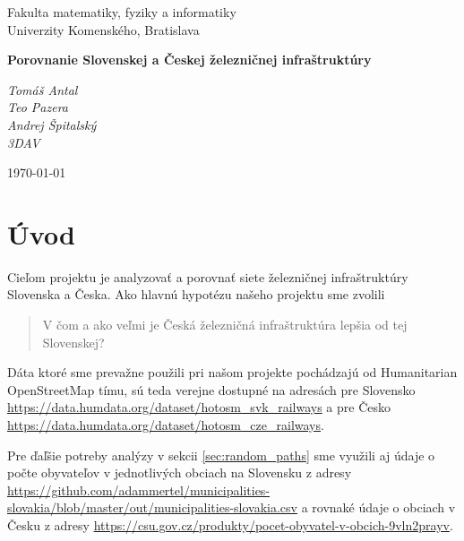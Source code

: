 \documentclass[12pt,a4paper]{article}
\begin{document}
\begin{titlepage}
  \centering

  {\large
    Fakulta matematiky, fyziky a informatiky\\
    Univerzity Komenského, Bratislava
  }\par

  \vspace{4cm}

  {\bfseries\LARGE
    Porovnanie Slovenskej a Českej železničnej infraštruktúry
  }\par

  \vspace{0.5cm}

  \vfill

  \begin{flushleft}
    {\itshape
      Tomáš Antal\\
      Teo Pazera\\
      Andrej Špitalský \\
      3DAV
    }
  \end{flushleft}

  \begin{flushright}
    \today
  \end{flushright}

\end{titlepage}

\newpage

\section{Úvod}
Cieľom projektu je analyzovať a porovnať siete železničnej infraštruktúry Slovenska a Česka. Ako hlavnú hypotézu našeho projektu sme zvolili \begin{quote}
    V čom a ako veľmi je Česká železničná infraštruktúra lepšia od tej Slovenskej?
\end{quote} 
Dáta ktoré sme prevažne použili pri našom projekte pochádzajú od Humanitarian OpenStreetMap tímu, sú teda verejne dostupné na adresách pre Slovensko \url{https://data.humdata.org/dataset/hotosm_svk_railways} a pre Česko \url{https://data.humdata.org/dataset/hotosm_cze_railways}.

Pre ďaľšie potreby analýzy v sekcii \ref{sec:random_paths} sme využili aj údaje o počte obyvateľov v jednotlivých obciach na Slovensku z adresy \url{https://github.com/adammertel/municipalities-slovakia/blob/master/out/municipalities-slovakia.csv}
a rovnaké údaje o obciach v Česku z adresy \url{https://csu.gov.cz/produkty/pocet-obyvatel-v-obcich-9vln2prayv}. 



\newpage

\newpage

\newpage

\newpage

\end{document}
